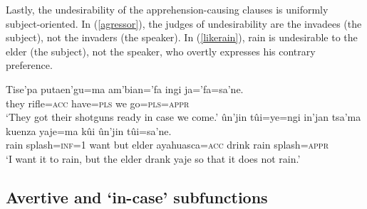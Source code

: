 \documentclass[output=paper,colorlinks,citecolor=brown]{langscibook}
\begin{document}
Lastly, the undesirability of the apprehension-causing  clauses is uniformly subject-oriented. In (\ref{agressor}), the judges of undesirability are the invadees (the subject), not the invaders (the speaker). In (\ref{likerain}), rain is undesirable to the elder (the subject), not the speaker, who overtly expresses his contrary preference.
\begin{exe}
    \ex \label{agressor}
    \gll Tise'pa putaen'gu=ma am'bian='fa {\ob}ingi ja='fa=sa'ne.{\cb} \\
    they rifle=\textsc{acc} have=\textsc{pls} we go=\textsc{pls=appr} \\
    \glt `They got their shotguns ready in case we come.'
    \ex \label{likerain}
    \gll ûn'jin tûi=ye=ngi in'jan tsa'ma kuenza yaje=ma kûi {\ob}ûn'jin tûi=sa'ne.{\cb} \\
    rain splash=\textsc{inf=1} want but elder ayahuasca=\textsc{acc} drink rain splash=\textsc{appr} \\
    \glt `I want it to rain, but the elder drank yaje so that it does not rain.'
\end{exe}




\subsection{Avertive and `in-case' subfunctions} \label{sec:precautioningsubfunctions}
\end{document}

